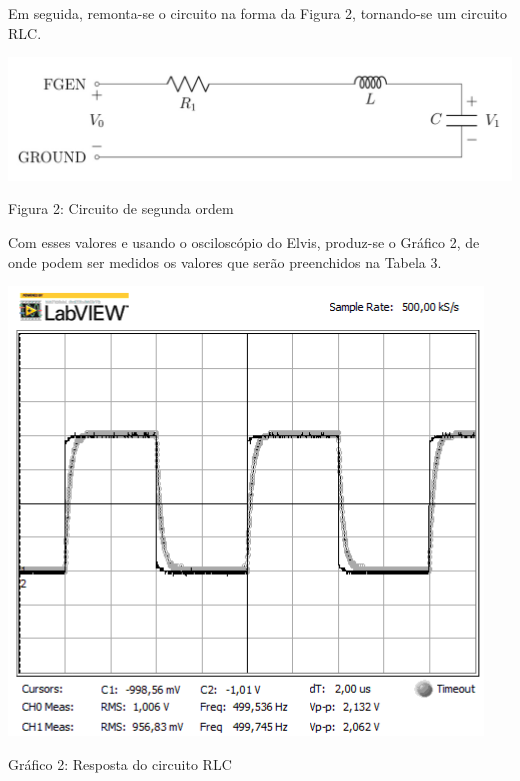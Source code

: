 \documentclass[a4 paper]{article}
\begin{document}
Em seguida, remonta-se o circuito na forma da Figura 2, tornando-se um circuito RLC.

\begin{table}[h]
\centering
\includegraphics[scale=0.3]{figuras/figura3}
\end{table}

\begin{center}
Figura 2: Circuito de segunda ordem
\end{center}






Com esses valores e usando o osciloscópio do Elvis, produz-se o Gráfico 2, de onde podem ser medidos os valores que serão preenchidos na Tabela 3. 


\begin{table}[h]
\centering
\includegraphics[scale=0.6]{rgadicoas/rgadicoa2}
\end{table}

\begin{center}
Gráfico 2: Resposta do circuito RLC
\end{center}
\end{document}
